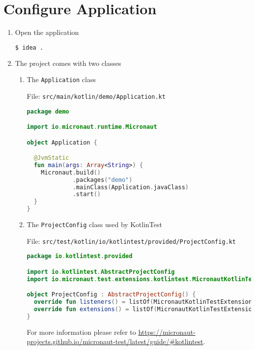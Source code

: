 \section{Configure Application}\label{sec:configuration}

\begin{enumerate}

\item Open the application

\begin{lstlisting}[language=bash]
$ idea .
\end{lstlisting}

\item The project comes with two classes

\begin{enumerate}
\item The \texttt{Application} class


File: \texttt{src/main/kotlin/demo/Application.kt}

\begin{lstlisting}[language=Kotlin]
package demo

import io.micronaut.runtime.Micronaut

object Application {

  @JvmStatic
  fun main(args: Array<String>) {
    Micronaut.build()
             .packages("demo")
             .mainClass(Application.javaClass)
             .start()
  }
}
\end{lstlisting}

\item The \texttt{ProjectConfig} class used by KotlinTest

File: \texttt{src/test/kotlin/io/kotlintest/provided/ProjectConfig.kt}

\begin{lstlisting}[language=Kotlin]
package io.kotlintest.provided

import io.kotlintest.AbstractProjectConfig
import io.micronaut.test.extensions.kotlintest.MicronautKotlinTestExtension

object ProjectConfig : AbstractProjectConfig() {
  override fun listeners() = listOf(MicronautKotlinTestExtension)
  override fun extensions() = listOf(MicronautKotlinTestExtension)
}
\end{lstlisting}

For more information please refer to \url{https://micronaut-projects.github.io/micronaut-test/latest/guide/\#kotlintest}.

\end{enumerate}


\end{enumerate}
